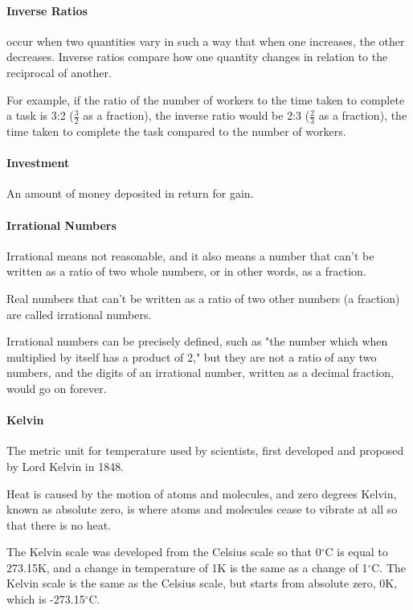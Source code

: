 \documentclass[12pt]{article}
\begin{document}
\paragraph{Inverse Ratios} occur when two quantities vary in such a way that when one increases, the other decreases. Inverse ratios compare how one quantity changes in relation to the reciprocal of another.

For example, if the ratio of the number of workers to the time taken to complete a task is 3:2 ($\frac{3}{2}$ as a fraction), the inverse ratio would be 2:3 ($\frac{2}{3}$ as a fraction), the time taken to complete the task compared to the number of workers.

\paragraph{Investment}
An amount of money deposited in return for gain.

\paragraph{Irrational Numbers}

Irrational means not reasonable, and it also means a number that can't be written as a ratio of two whole numbers, or in other words, as a fraction.

Real numbers that can't be written as a ratio of two other numbers (a fraction) are called irrational numbers.

Irrational numbers can be precisely defined, such as "the number which when multiplied by itself has a product of 2," but they are not a ratio of any two numbers, and the digits of an irrational number, written as a decimal fraction, would go on forever.

\paragraph{Kelvin}
The metric unit for temperature used by scientists, first developed and proposed by Lord Kelvin in 1848.

Heat is caused by the motion of atoms and molecules, and zero degrees Kelvin, known as absolute zero, is where atoms and molecules cease to vibrate at all so that there is no heat.

The Kelvin scale was developed from the Celsius scale so that 0$^{\circ}$C is equal to 273.15K, and a change in temperature of 1K is the same as a change of 1$^{\circ}$C.  The Kelvin scale is the same as the Celsius scale, but starts from absolute zero, 0K, which is -273.15$^{\circ}$C.
\end{document}
